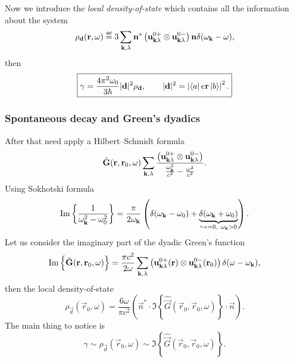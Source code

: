 Now we introduce the \textit{local density-of-state} which contains all the information about the system
\begin{equation}
	\rho_{\vec{d}} (\vec{r}, \omega) \myeq 3 \sum_{\kv, \lambda} \vec{n}^* \left( \vec{u}^{0+}_{\kv \lambda} \otimes \vec{u}^{0-}_{\kv \lambda} \right) \vec{n} \delta (\omega_{\kv} - \omega),
\end{equation}
then
\begin{equation}
	\boxed{	\gamma  = \frac{4 \pi^2 \omega_0}{3 \hbar} |\mathbf{d}|^2 \rho_{\mathbf{d}}, \qquad |\mathbf{d}|^2 = \left|  \left\langle {a} \right\rvert e \mathbf{r} \left\lvert {b} \right\rangle \right|^2. }
	\label{eq:gamma_start}
\end{equation}

\subsubsection{Spontaneous decay and Green's dyadics}

After that need apply a Hilbert–Schmidt formula
\begin{equation}
	\hat{\mathbf{G}} (\mathbf{r}, \mathbf{r}_0, \omega) \sum_{\mathbf{k}, \lambda} \frac{\left( \mathbf{u}^{0+}_{\mathbf{k} \lambda} \otimes \mathbf{u}^{0-}_{\mathbf{k} \lambda} \right)}{\frac{\omega_{\mathbf{k}}^2}{c^2} - \frac{\omega^2}{c^2}}.
\end{equation}
Using Sokhotski formula
\begin{equation}
	\operatorname{Im} \left\{ \frac{1}{\omega_{\mathbf{k}}^2 - \omega_{0}^2} \right\} = \frac{\pi}{2 \omega_{\mathbf{k}}} \left( \delta(\omega_{\mathbf{k}} - \omega_{0}) + \underbrace{\delta(\omega_{\mathbf{k}} + \omega_{0})}_{\hookrightarrow=0,\ \omega_{\mathbf{k}}>0}\right).
\end{equation}
Let us consider the imaginary part of the dyadic Green's function
\begin{equation}
	\operatorname{Im} \left\{ \hat{\mathbf{G}}(\mathbf{r}, \mathbf{r}_0, \omega) \right\} = \frac{\pi c^2}{2 \omega} \sum_{\mathbf{k}, \lambda} \left( \mathbf{u}^{0+}_{\mathbf{k} \lambda} (\mathbf{r}) \otimes \mathbf{u}^{0-}_{\mathbf{k} \lambda} (\mathbf{r}_0) \right) \delta (\omega - \omega_{\mathbf{k}}),
\end{equation}
then the local density-of-state
\begin{equation}
	\rho_{\vec{d}} (\vec{r}_0, \omega) = \frac{6 \omega}{\pi c^2} \left( \vec{n}^* \cdot \Im \left\{ \hat{\vec{G}} (\vec{r}_0, \vec{r}_0, \omega) \right\} \cdot \vec{n} \right).
\end{equation}
The main thing to notice is
\begin{equation}
	\boxed{	\gamma \sim \rho_{\vec{d}} (\vec{r}_0, \omega) \sim \Im \left\{ \hat{\vec{G}} (\vec{r}_0, \vec{r}_0, \omega) \right\}.}
\end{equation}

